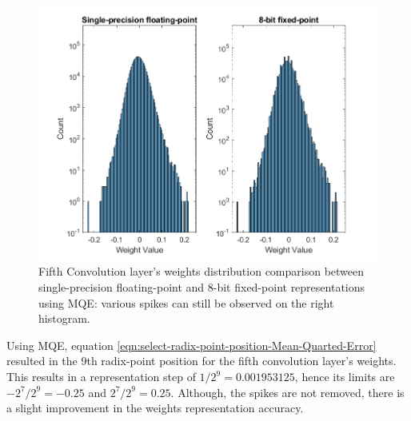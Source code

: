 \begin{figure} [H]
	\centering
	\includegraphics[scale=0.9]{Images/Weights-distributions/original-vs-fixed8/weight-distribution-conv5-MQE.png}
	\decoRule
	\caption[Fifth Convolution layer's weights distribution comparison between single-precision floating-point and 8-bit fixed-point representations using MQE]{Fifth Convolution layer's weights distribution comparison between single-precision floating-point and 8-bit fixed-point representations using MQE: various spikes can still be observed on the right histogram.}
	\label{fig:weight-distribution-comparison-conv5-MQE}
\end{figure}

Using MQE, equation \ref{eqn:select-radix-point-position-Mean-Quarted-Error} resulted in the 9th radix-point position for the fifth convolution layer's weights. This results in a representation step of $1/2^9 = 0.001953125$, hence its limits are $-2^7/2^9 = -0.25$ and $2^7/2^9 = 0.25$. Although, the spikes are not removed, there is a slight improvement in the weights representation accuracy.

